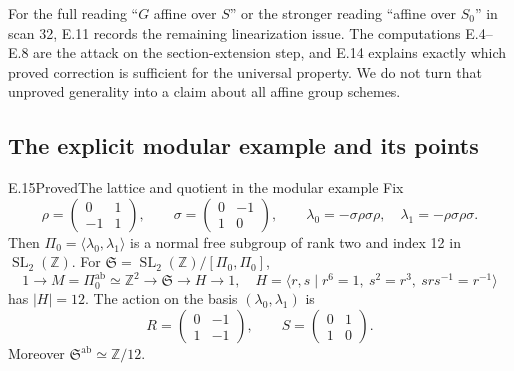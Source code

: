\noindent
For the full reading ``\(G\) affine over \(S\)'' or the stronger
reading ``affine over \(S_0\)'' in scan 32, E.11 records the
remaining linearization issue.  The computations E.4--E.8 are the
attack on the section-extension step, and E.14 explains exactly
which proved correction is sufficient for the universal property.
We do not turn that unproved generality into a claim about all
affine group schemes.

\subsection{The explicit modular example and its points}

\begin{statement}{E.15}{Proved}{The lattice and quotient in the modular example}
Fix
\[
 \rho=\begin{pmatrix}0&1\\-1&1\end{pmatrix},\qquad
 \sigma=\begin{pmatrix}0&-1\\1&0\end{pmatrix},\qquad
 \lambda_0=-\sigma\rho\sigma\rho,
 \quad\lambda_1=-\rho\sigma\rho\sigma.
\]
Then \(\Pi_0=\langle\lambda_0,\lambda_1\rangle\) is a normal free
subgroup of rank two and index 12 in \(\operatorname{SL}_2(\mathbb Z)\).
For
\(\mathfrak S=\operatorname{SL}_2(\mathbb Z)/[\Pi_0,\Pi_0]\),
\[
 1\longrightarrow M=\Pi_0^{\mathrm{ab}}\simeq\mathbb Z^2
 \longrightarrow\mathfrak S\longrightarrow H\longrightarrow1,
 \quad
 H=\langle r,s\mid r^6=1,\ s^2=r^3,\ srs^{-1}=r^{-1}\rangle
\]
has \(|H|=12\).  The action on the basis \((\lambda_0,\lambda_1)\)
is
\[
             R=\begin{pmatrix}0&-1\\1&-1\end{pmatrix},\qquad
             S=\begin{pmatrix}0&1\\1&0\end{pmatrix}.
\]
Moreover \(\mathfrak S^{\mathrm{ab}}\simeq\mathbb Z/12\).
\end{statement}
